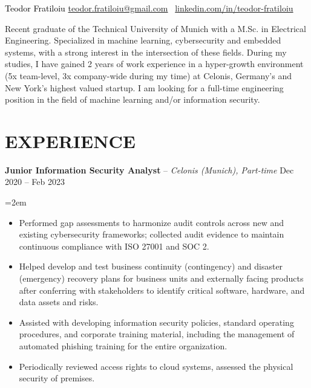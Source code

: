 \documentclass[paper=a4,fontsize=11pt]{scrartcl}
\newcommand{\sepspace}{\vspace*{0.35em}}		%
\newcommand{\NewPart}[1]{\section*{\uppercase{#1}}}
\newcommand{\EducationEntry}[4]{
		\noindent \textit{#1} \hfill      %
		\colorbox{custom_gray}{\color{white}#2} \par  %
		\noindent\hangindent=2em\hangafter=0 \small #3 %
		\normalsize \par}
\newcommand{\WorkEntry}[4]{				  %
		\noindent \textbf{#1} – \textit{#3} \hfill      %
		\colorbox{custom_gray}{\color{white}#2} \par  %
		\noindent\hangindent=2em\hangafter=0 \small #4 %
		\normalsize \par}
\begin{document}
\begin{adjustwidth}{-0.9in}{}
     	\textcolor{black}{
	\parbox[b][2.5cm][c]{21cm}{%
            \huge 
            \centering
            \vspace*{1.5cm}
            \hspace*{3.5cm}Teodor Fratiloiu
            \large
            \newline
            \href{mailto:teodor.fratiloiu@gmail.com}{teodor.fratiloiu@gmail.com} \textbar\
            \href{https://www.linkedin.com/in/teodor-fratiloiu/}{linkedin.com/in/teodor-fratiloiu}
        }
}

\end{adjustwidth}
\vspace{-0.3cm}
Recent graduate of the Technical University of Munich with a M.Sc. in Electrical Engineering. Specialized in machine learning, cybersecurity and embedded systems, with a strong interest in the intersection of these fields. During my studies, I have gained 2 years of work experience in a hyper-growth environment (5x team-level, 3x company-wide during my time) at Celonis, Germany's and New York’s highest valued startup. I am looking for a full-time engineering position in the field of machine learning and/or information security.
\vspace{-0.5cm}
\NewPart{Experience}{}
\vspace{-0.3cm}
\WorkEntry{Junior Information Security Analyst}{Dec 2020 – Feb 2023}{Celonis (Munich), Part-time}
{
\begin{itemize}
  \item Performed gap assessments to harmonize audit controls across new and existing cybersecurity frameworks; collected audit evidence to maintain continuous compliance with ISO 27001 and SOC 2.
  \item Helped develop and test business continuity (contingency) and disaster (emergency) recovery plans for business units and externally facing products after conferring with stakeholders to identify critical software, hardware, and data assets and risks.
  \item Assisted with developing information security policies, standard operating procedures, and corporate training material, including the management of automated phishing training for the entire organization.
  \item Periodically reviewed access rights to cloud systems, assessed the physical security of premises.
\end{itemize}
}
\end{document}
